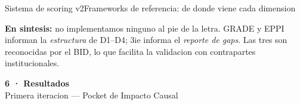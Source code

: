\documentclass[aspectratio=169,10pt]{beamer}
\newenvironment{card}[1][cardbg]{%
  \begin{tcolorbox}[colback=#1,colframe=bidlight!40,arc=4pt,
    boxrule=0.4pt,left=5pt,right=5pt,top=4pt,bottom=4pt]}%
  {\end{tcolorbox}}
\begin{document}
\begin{frame}{Sistema de scoring v2}{Frameworks de referencia: de donde viene cada dimension}
\vspace{3mm}
\begin{card}
\scriptsize\color{bidgray}
\textbf{\color{bidaccent}En sintesis:} no implementamos ninguno al pie de la letra. GRADE y EPPI informan la \emph{estructura} de D1--D4; 3ie informa el \emph{reporte de gaps}. Las tres son reconocidas por el BID, lo que facilita la validacion con contrapartes institucionales.
\end{card}
\end{frame}

{
\begin{frame}[plain]\vspace{20mm}
\begin{center}
{\Large\bfseries\color{bidaccent}6 · Resultados}\\[5pt]
{\color{bidgray}\normalsize Primera iteracion --- Pocket de Impacto Causal}
\end{center}
\end{frame}
}
\end{document}

